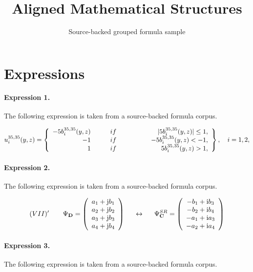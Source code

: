 \documentclass[11pt]{article}
\title{Aligned Mathematical Structures}
\author{Source-backed grouped formula sample}
\date{}
\begin{document}
\maketitle
\section{Expressions}
\paragraph{Expression 1.} The following expression is taken from a source-backed formula corpus.

\begin{align*}u^{35,35}_i(y,z)=\left\{\begin{array}{rrrl}- 5 b_i^{35,35}(y,z) \ & \ \ \ \ \ if& \ \ \ \ \ \ \ \ \ \ \ \ |5 b_i^{35,35}(y,z)|\leq 1, \\-1 \ & \ \ \ \ \ if& \ \ \ \ \ \ \ \ \ \ \ \ \ -5 b_i^{35,35}(y,z) < -1,\\1 \ & \ \ \ \ \ if& \ \ \ \ \ \ \ \ \ \ \ \ \-5 b_i^{35,35}(y,z) > 1,\\\end{array}\right\},\ \ \ i=1,2,\end{align*}

\paragraph{Expression 2.} The following expression is taken from a source-backed formula corpus.

\begin{align*}(VII)' \hspace{7mm} \Psi_{\bf D} =\left(\begin{array}{c}a_1 +{\rm j}b_1 \\a_2 +{\rm j}b_2 \\a_3 +{\rm j}b_3 \\a_4 +{\rm j}b_4\end{array}\right) \hspace{5mm} \leftrightarrow \hspace{5mm}\Psi^{SR}_{\bf C} =\left(\begin{array}{c}-b_1+{\rm i}b_3 \\-b_2+{\rm i}b_4 \\-a_1+{\rm i}a_3 \\-a_2+{\rm i}a_4\end{array}\right)\end{align*}

\paragraph{Expression 3.} The following expression is taken from a source-backed formula corpus.
\end{document}
